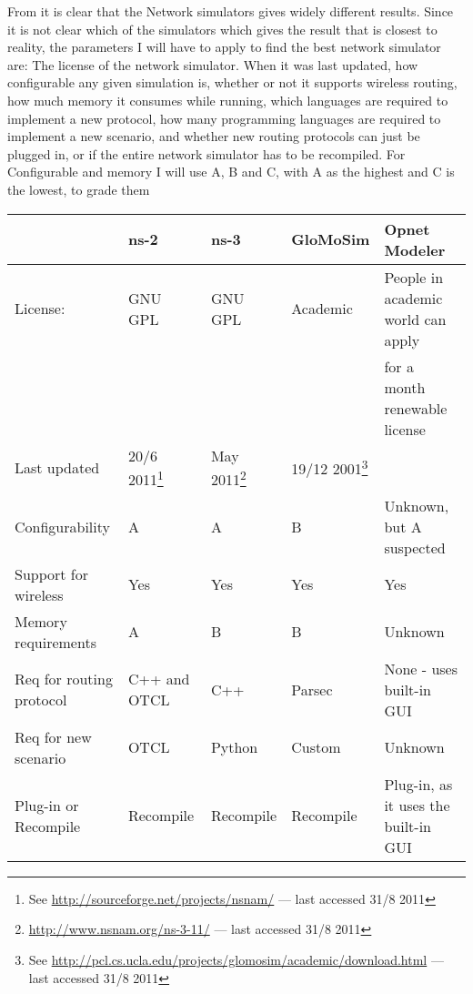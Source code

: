 From \cite{MANcom} it is clear that the Network simulators gives widely different results. Since it is not clear which of the simulators which gives the result that is closest to reality, the parameters I will have to apply to find the best network simulator are: The license of the network simulator. When it was last updated, how configurable any given simulation is, whether or not it supports wireless routing, how much memory it consumes while running, which languages are required to implement a new protocol, how many programming languages are required to implement a new scenario, and whether new routing protocols can just be plugged in, or if the entire network simulator has to be recompiled. For Configurable and memory I will use A, B and C, with A as the highest and C is the lowest, to grade them\\
\begin{scriptsize}
\begin{minipage}{15.0cm}
\begin{tabular}[4]{lllll}
                          & ns-2      & ns-3      & GloMoSim & Opnet Modeler \\
\hline
License:                  & GNU GPL   & GNU GPL   & Academic & People in academic world can apply\\        &           &           &          & for a month renewable license \\
Last updated              & 20/6 2011\footnote{See \url{http://sourceforge.net/projects/nsnam/} --- last accessed 31/8 2011} & May 2011\footnote{\url{http://www.nsnam.org/ns-3-11/} --- last accessed 31/8 2011} & 19/12 2001\footnote{See \url{http://pcl.cs.ucla.edu/projects/glomosim/academic/download.html} --- last accessed 31/8 2011}  & \\
Configurability           & A         & A         & B         & Unknown, but A suspected\\
Support for wireless      & Yes       & Yes       & Yes       & Yes \\
Memory requirements       & A         & B         & B         & Unknown\\
Req for routing protocol  & C++ and OTCL & C++    & Parsec    & None - uses built-in GUI\\
Req for new scenario      & OTCL      & Python    & Custom    & Unknown \\
Plug-in or Recompile      & Recompile & Recompile & Recompile & Plug-in, as it uses the built-in GUI
\end{tabular}
\end{minipage}
\end{scriptsize}

